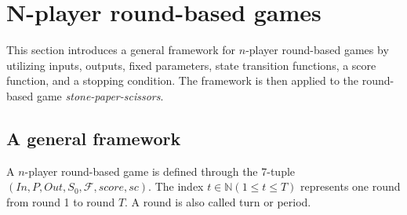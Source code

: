 \section{{N}-player round-based games}
\label{sec:round}
This section introduces a general framework for $n$-player round-based games by utilizing
inputs, outputs, fixed parameters, state transition functions, a score function, and a stopping condition.
The framework is then applied to the round-based game \textit{stone-paper-scissors}.

\subsection{A general framework}
\label{subsec:framework}

A $n$-player round-based game is defined through the 7-tuple $(In, P, Out, S_0, \mathcal{F}, score, sc)$. 
The index $t \in  \mathbb{N} (1 \le t \le T)$ represents one round from round 1 to round $T$.
A round is also called turn or period.

